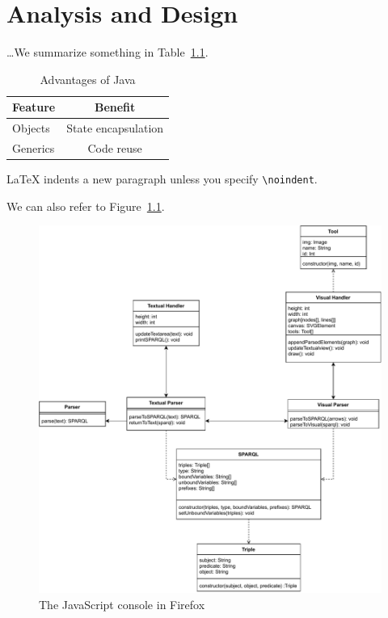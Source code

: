 \chapter{Analysis and Design}
\label{chap:analysis-and-design}


\bigskip

\dots We summarize something in Table~\ref{tab:java-advantages}.

\begin{table}[tb] %
  \centering
  \begin{tabular}{l c}  %
    Feature  & Benefit
 \\\hline
    Objects  & State encapsulation
 \\
    Generics & Code reuse
  \end{tabular}
  \caption{Advantages of Java}
  \label{tab:java-advantages}
\end{table}

\bigskip

\noindent
LaTeX indents a new paragraph unless you specify \lstinline{\noindent}.

\bigskip

We can also refer to Figure~\ref{fig:firefox-js-console}.

\begin{figure}[tb] %
  \centering
  \includegraphics[width=.9\linewidth]{2nd_iteration_design.pdf}
  \caption{The JavaScript console in Firefox }
  \label{fig:firefox-js-console}
\end{figure}
